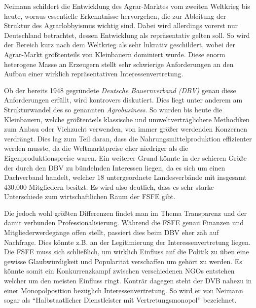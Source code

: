 Neimann \cite{Neimann200312} schildert die Entwicklung des Agrar-Marktes vom 
zweiten Weltkrieg bis 
heute, woraus essentielle Erkenntnisse hervorgehen, die zur Ableitung der 
Struktur des Agrarlobbyismus wichtig sind. Dabei wird allerdings vorerst nur 
Deutschland betrachtet, dessen Entwicklung als repräsentativ gelten soll. So 
wird der Bereich kurz nach dem Weltkrieg als sehr lukrativ geschildert, wobei 
der Agrar-Markt größtenteils von Kleinbauern dominiert wurde. Diese enorm 
heterogene Masse an Erzeugern stellt sehr schwierige Anforderungen an den 
Aufbau einer wirklich repräsentativen Interessenvertretung.

Ob der bereits 1948 gegründete \emph{Deutsche Bauernverband (DBV)} genau diese 
Anforderungen erfüllt, wird 
kontrovers diskutiert. \cite{Neimann200312} Dies liegt unter anderem am 
Strukturwandel des so genannten \emph{Agrobusiness}. So wurden bis heute die 
Kleinbauern, welche größtenteils klassische und umweltverträglichere Methodiken 
zum Anbau oder Viehzucht verwenden, von immer größer werdenden Konzernen 
verdrängt. Dies lag zum Teil daran, dass die Nahrungsmittelproduktion 
effizienter werden musste, da die Weltmarktpreise eher niedriger als die 
Eigenproduktionspreise waren. Ein weiterer Grund könnte in der schieren Größe 
der durch den DBV zu bündelnden Interessen liegen, da es sich um einen 
Dachverband handelt, welcher 18 untergeordnete Landesverbände mit insgesamt 
430.000 Mitgliedern besitzt. Es wird also deutlich, dass es sehr starke 
Unterschiede zum wirtschaftlichen Raum der FSFE gibt.

Die jedoch wohl größten Differenzen findet man im Thema Transparenz und der 
damit verbunden Professionalisierung. Während die FSFE genau Finanzen und 
Mitgliederwerdegänge offen stellt, passiert dies beim DBV eher zäh auf 
Nachfrage. Dies könnte z.B. an der Legitimierung der Interessenvertretung 
liegen. Die FSFE muss sich schließlich, um wirklich Einfluss auf die Politik zu 
üben eine gewisse Glaubwürdigkeit und Popularität verschaffen um gehört zu 
werden. Es könnte somit ein Konkurrenzkampf zwischen verschiedenen NGOs 
entstehen welcher um den meisten Einfluss ringt. Konträr dagegen steht der DVB 
nahezu in einer Monopolposition bezüglich Interessenvertretung. So wird er von 
Neimann sogar als ``Halbstaatlicher Dienstleister mit Vertretungsmonopol'' 
\cite{Neimann200312} bezeichnet.




